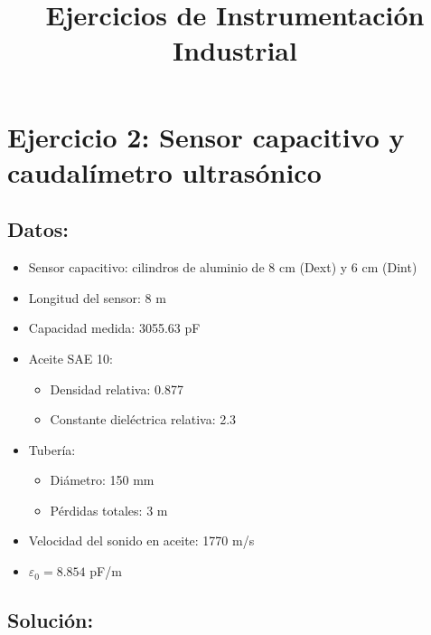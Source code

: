 \documentclass[a4paper,12pt]{article}
\title{Ejercicios de Instrumentación Industrial}
\author{}
\date{}
\begin{document}
\maketitle

\section*{Ejercicio 2: Sensor capacitivo y caudalímetro ultrasónico}

\subsection*{Datos:}
\begin{itemize}
    \item Sensor capacitivo: cilindros de aluminio de 8 cm (Dext) y 6 cm (Dint)
    \item Longitud del sensor: 8 m
    \item Capacidad medida: 3055.63 pF
    \item Aceite SAE 10:
    \begin{itemize}
        \item Densidad relativa: 0.877
        \item Constante dieléctrica relativa: 2.3
    \end{itemize}
    \item Tubería:
    \begin{itemize}
        \item Diámetro: 150 mm
        \item Pérdidas totales: 3 m
    \end{itemize}
    \item Velocidad del sonido en aceite: 1770 m/s
    \item $\varepsilon_0 = 8.854$ pF/m
\end{itemize}

\subsection*{Solución:}
\end{document}
